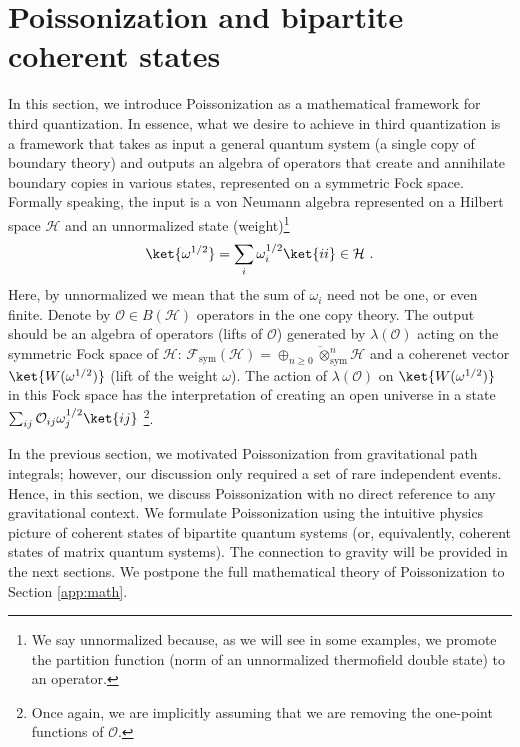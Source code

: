 \documentclass[a4paper,11pt]{article}
\theoremstyle{definition}
\numberwithin{equation}{section}
\newcommand{\mH}{\mathcal{H}}
\begin{document}
\section{Poissonization and bipartite coherent states}
\label{sec:bipartitecoherent}
In this section, we introduce Poissonization as a mathematical framework for third quantization. In essence, what we desire to achieve in third quantization is a framework that takes as input a general quantum system (a single copy of boundary theory) and outputs an algebra of operators that create and annihilate boundary copies in various states, represented on a symmetric Fock space.
Formally speaking, the input is a von Neumann algebra represented on a Hilbert space $\mH$ and an unnormalized state (weight)\footnote{We say unnormalized because, as we will see in some examples, we promote the partition function (norm of an unnormalized thermofield double state) to an operator.} 
\begin{eqnarray}
\ket{\omega^{1/2}}=\sum_i \omega_{i}^{1/2}\ket{ii}\in \mH \ .
\end{eqnarray}
Here, by unnormalized we mean that the sum of $\omega_{i}$ need not be one, or even finite. Denote by $\mathcal{O}\in B(\mathcal{H})$  operators in the one copy theory. The output should be an algebra of operators (lifts of $\mathcal{O}$) generated by $\lambda(\mathcal{O})$ acting on the symmetric Fock space of $\mH$: $\mathcal{F}_\text{sym}(\mathcal{H}) = \overline{\oplus_{n\geq 0}\otimes_\text{sym}^n\mathcal{H}}$ and a coherenet vector $\ket{W(\omega^{1/2})}$ (lift of the weight $\omega$). The action of $\lambda(\mathcal{O})$ on $\ket{W(\omega^{1/2})}$ in this Fock space has the interpretation of creating an open universe in a state $\sum_{ij}\mathcal{O}_{ij}\omega_j^{1/2}\ket{ij}$ \footnote{Once again, we are implicitly assuming that we are removing the one-point functions of $\mathcal{O}$.}.

In the previous section, we motivated Poissonization from gravitational path integrals; however, our discussion only required a set of rare independent events. Hence, in this section, we discuss Poissonization with no direct reference to any gravitational context. We formulate Poissonization using the intuitive physics picture of coherent states of bipartite quantum systems (or, equivalently, coherent states of matrix quantum systems). The connection to gravity will be provided in the next sections. We postpone the full mathematical theory of Poissonization to Section \ref{app:math}.
\end{document}

